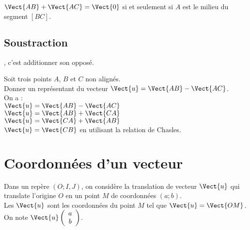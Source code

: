 \documentclass{book}
\begin{document}
\begin{Remarque} 
$\Vect{AB}+\Vect{AC}=\Vect{0}$ si et seulement si $A$ est le milieu du segment $[BC]$.
\end{Remarque}


\subsection{Soustraction}

\begin{Definition}[Soustraction] , c'est additionner son opposé.
\end{Definition}

\begin{Exemple}
Soit trois points $A$, $B$ et $C$ non alignés. \\
Donner un représentant du vecteur $\Vect{u} =\Vect{AB}-\Vect{AC}$.\\
On a :\\
$\Vect{u}=\Vect{AB}-\Vect{AC}$\\
$\Vect{u}=\Vect{AB}+\Vect{CA}$\\
$\Vect{u}=\Vect{CA}+\Vect{AB}$\\
$\Vect{u}=\Vect{CB}$ en utilisant la relation de Chasles.
\end{Exemple}



\section{Coordonnées d'un vecteur}


\begin{Definition}
Dans un repère $(O;I,J)$,  on considère la translation de vecteur $\Vect{u}$ qui translate l'origine $O$ en un point $M$ de coordonnées $(a;b)$. \\
Les  $\Vect{u}$ sont les coordonnées du point  $M$ tel que  $\Vect{u} =\Vect{OM}$.\\
On note $\Vect{u}\left( \begin{array}{c} a\\b\end{array}\right)$.
\begin{center}
\end{center}
\end{Definition}
\end{document}
